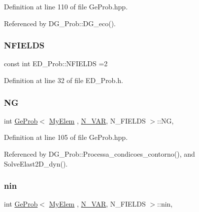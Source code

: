 Definition at line 110 of file Ge\+Prob.\+hpp.



Referenced by D\+G\+\_\+\+Prob\+::\+D\+G\+\_\+eco().

\mbox{\label{classED__Prob_a55ae39ba5cc4f4c2c9f284d49056ef26}} 
\subsubsection{\texorpdfstring{N\+F\+I\+E\+L\+DS}{NFIELDS}}
{\footnotesize\ttfamily const int E\+D\+\_\+\+Prob\+::\+N\+F\+I\+E\+L\+DS =2\hspace{0.3cm}{\ttfamily [private]}}



Definition at line 32 of file E\+D\+\_\+\+Prob.\+h.

\mbox{\label{classGeProb_ac9a59a8c31ccad50b7eabc436c365391}} 
\subsubsection{\texorpdfstring{NG}{NG}}
{\footnotesize\ttfamily int \hyperlink{classGeProb}{Ge\+Prob}$<$ \hyperlink{DG__Prob_8h_a83cd887ced9a6587428f267e50cd4787}{My\+Elem} , \hyperlink{classED__Prob_a4e7d2ff1a8e435e336fb00c527224b5a}{N\+\_\+\+V\+AR}, N\+\_\+\+F\+I\+E\+L\+DS $>$\+::NG\hspace{0.3cm}{\ttfamily [protected]}, {\ttfamily [inherited]}}



Definition at line 105 of file Ge\+Prob.\+hpp.



Referenced by D\+G\+\_\+\+Prob\+::\+Processa\+\_\+condicoes\+\_\+contorno(), and Solve\+Elast2\+D\+\_\+dyn().

\mbox{\label{classGeProb_a2434630926ff59b81f12420354f533a7}} 
\subsubsection{\texorpdfstring{nin}{nin}}
{\footnotesize\ttfamily int \hyperlink{classGeProb}{Ge\+Prob}$<$ \hyperlink{DG__Prob_8h_a83cd887ced9a6587428f267e50cd4787}{My\+Elem} , \hyperlink{classED__Prob_a4e7d2ff1a8e435e336fb00c527224b5a}{N\+\_\+\+V\+AR}, N\+\_\+\+F\+I\+E\+L\+DS $>$\+::nin\hspace{0.3cm}{\ttfamily [protected]}, {\ttfamily [inherited]}}




